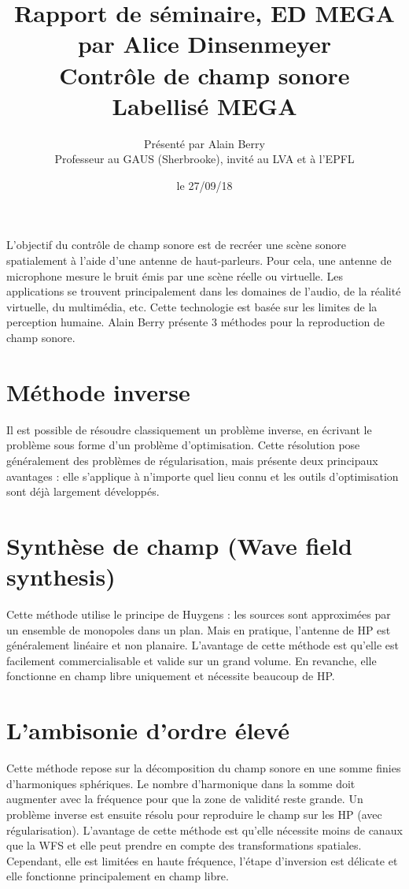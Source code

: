 \documentclass[12pt]{article}
\title{ {\fontsize{14pt}{14pt}\selectfont Rapport de séminaire, ED MEGA par Alice Dinsenmeyer} \\[1cm]
\fontsize{18pt}{18pt}\selectfont\textbf{ Contrôle de champ sonore\\ Labellisé MEGA}} %
\author{
\large{Présenté par Alain Berry}\\
Professeur au GAUS (Sherbrooke), invité au LVA et à l'EPFL
\vspace{-5mm}
}
\date{le 27/09/18}
\begin{document}
\maketitle

L'objectif du contrôle de champ sonore est de recréer une scène sonore spatialement à l'aide d'une antenne de haut-parleurs. Pour cela, une antenne de microphone mesure le bruit émis par une scène réelle ou virtuelle. Les applications se trouvent principalement dans les domaines de l'audio, de la réalité virtuelle, du multimédia, etc. Cette technologie est basée sur les limites de la perception humaine. Alain Berry présente 3 méthodes pour la reproduction de champ sonore.

\section{Méthode inverse}
Il est possible de résoudre classiquement un problème inverse, en écrivant le problème sous forme d'un problème d'optimisation. Cette résolution pose généralement des problèmes de régularisation, mais présente deux principaux avantages : elle s'applique à n'importe quel lieu connu et les outils d'optimisation sont déjà largement développés.

\section{Synthèse de champ (Wave field synthesis)}
Cette méthode utilise le principe de Huygens : les sources sont approximées par un ensemble de monopoles dans un plan. Mais en pratique, l'antenne de HP est généralement linéaire et non planaire. L'avantage de cette méthode est qu'elle est facilement commercialisable et valide sur un grand volume. En revanche, elle fonctionne en champ libre uniquement et nécessite beaucoup de HP.

\section{L'ambisonie d'ordre élevé}
Cette méthode repose sur la décomposition du champ sonore en une somme finies d'harmoniques sphériques. Le nombre d'harmonique dans la somme doit augmenter avec la fréquence pour que la zone de validité reste grande. Un problème inverse est ensuite résolu pour reproduire le champ sur les HP (avec régularisation). L'avantage de cette méthode est qu'elle nécessite moins de canaux que la WFS et elle peut prendre en compte des transformations spatiales. Cependant, elle est limitées en haute fréquence, l'étape d'inversion est délicate et elle fonctionne principalement en champ libre.
\end{document}

